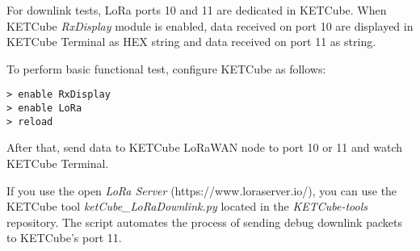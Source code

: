 \documentclass[twoside,a4paper]{refart}
\begin{document}
For downlink tests, LoRa ports 10 and 11 are dedicated in KETCube. When KETCube {\it RxDisplay} module is enabled, data received on port 10 are displayed in KETCube Terminal as HEX string and data received on port 11 as string.

To perform basic functional test, configure KETCube as follows:
\begin{Verbatim}[frame=single, fontsize=\small]
> enable RxDisplay
> enable LoRa
> reload
\end{Verbatim}

After that, send data to KETCube LoRaWAN node to port 10 or 11 and watch KETCube Terminal.

If you use the open {\it LoRa Server} ({https://www.loraserver.io/}), you can use the KETCube tool {\it ketCube\_LoRaDownlink.py} located in the {\it KETCube-tools} repository. The script automates the process of sending debug downlink packets to KETCube's port 11.


\clearpage





\end{document}
